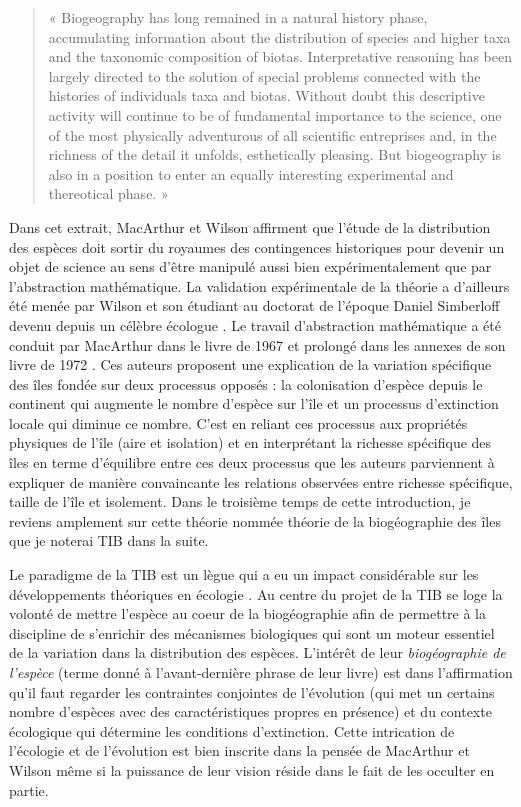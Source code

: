 \begin{quote}
« Biogeography has long remained in a natural history phase,
accumulating information about the distribution of species and higher
taxa and the taxonomic composition of biotas. Interpretative reasoning
has been largely directed to the solution of special problems connected
with the histories of individuals taxa and biotas. Without doubt this
descriptive activity will continue to be of fundamental importance to
the science, one of the most physically adventurous of all scientific
entreprises and, in the richness of the detail it unfolds, esthetically
pleasing. But biogeography is also in a position to enter an equally
interesting experimental and thereotical phase. »
\end{quote}

Dans cet extrait, MacArthur et Wilson affirment que l'étude de la
distribution des espèces doit sortir du royaumes des contingences
historiques pour devenir un objet de science au sens d'être manipulé
aussi bien expérimentalement que par l'abstraction mathématique. La
validation expérimentale de la théorie a d'ailleurs été menée par Wilson
et son étudiant au doctorat de l'époque Daniel Simberloff devenu depuis
un célèbre écologue \citep{Simberloff1969}. Le travail d'abstraction
mathématique a été conduit par MacArthur dans le livre de 1967 et
prolongé dans les annexes de son livre de 1972
\citep{macarthur1972geographical}. Ces auteurs proposent une explication
de la variation spécifique des îles fondée sur deux processus opposés :
la colonisation d'espèce depuis le continent qui augmente le nombre
d'espèce sur l'île et un processus d'extinction locale qui diminue ce
nombre. C'est en reliant ces processus aux propriétés physiques de l'île
(aire et isolation) et en interprétant la richesse spécifique des îles
en terme d'équilibre entre ces deux processus que les auteurs
parviennent à expliquer de manière convaincante les relations observées
entre richesse spécifique, taille de l'île et isolement. Dans le
troisième temps de cette introduction, je reviens amplement sur cette
théorie nommée théorie de la biogéographie des îles que je noterai TIB
dans la suite.

Le paradigme de la TIB est un lègue qui a eu un impact considérable sur
les développements théoriques en écologie \citep{Warren2015}. Au centre
du projet de la TIB se loge la volonté de mettre l'espèce au coeur de la
biogéographie afin de permettre à la discipline de s'enrichir des
mécanismes biologiques qui sont un moteur essentiel de la variation dans
la distribution des espèces. L'intérêt de leur \emph{biogéographie de
l'espèce} (terme donné à l'avant-dernière phrase de leur livre) est dans
l'affirmation qu'il faut regarder les contraintes conjointes de
l'évolution (qui met un certains nombre d'espèces avec des
caractéristiques propres en présence) et du contexte écologique qui
détermine les conditions d'extinction. Cette intrication de l'écologie
et de l'évolution est bien inscrite dans la pensée de MacArthur et
Wilson même si la puissance de leur vision réside dans le fait de les
occulter en partie.

